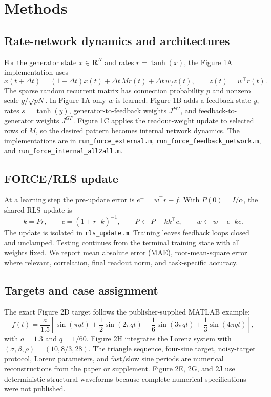 \section{Methods}

\subsection{Rate-network dynamics and architectures}
For the generator state $x\in\mathbf{R}^{N}$ and rates $r=\tanh(x)$, the Figure 1A implementation uses
\[
x(t+\Delta t)=(1-\Delta t)x(t)+\Delta t\,M r(t)+\Delta t\,w_f z(t),
\qquad z(t)=w^\top r(t).
\]
The sparse random recurrent matrix has connection probability $p$ and nonzero scale $g/\sqrt{pN}$. In Figure 1A only $w$ is learned. Figure 1B adds a feedback state $y$, rates $s=\tanh(y)$, generator-to-feedback weights $J^{FG}$, and feedback-to-generator weights $J^{GF}$. Figure 1C applies the readout-weight update to selected rows of $M$, so the desired pattern becomes internal network dynamics. The implementations are in \texttt{run\_force\_external.m}, \texttt{run\_force\_feedback\_network.m}, and \texttt{run\_force\_internal\_all2all.m}.

\subsection{FORCE/RLS update}
At a learning step the pre-update error is $e^-=w^\top r-f$. With $P(0)=I/\alpha$, the shared RLS update is
\[
k=Pr,\qquad c=(1+r^\top k)^{-1},\qquad
P\leftarrow P-kk^\top c,\qquad
w\leftarrow w-e^-kc.
\]
The update is isolated in \texttt{rls\_update.m}. Training leaves feedback loops closed and unclamped. Testing continues from the terminal training state with all weights fixed. We report mean absolute error (MAE), root-mean-square error where relevant, correlation, final readout norm, and task-specific accuracy.

\subsection{Targets and case assignment}
The exact Figure 2D target follows the publisher-supplied MATLAB example:
\[
f(t)=\frac{a}{1.5}\left[
\sin(\pi qt)+\frac{1}{2}\sin(2\pi qt)
+\frac{1}{6}\sin(3\pi qt)+\frac{1}{3}\sin(4\pi qt)\right],
\]
with $a=1.3$ and $q=1/60$. Figure 2H integrates the Lorenz system with $(\sigma,\beta,\rho)=(10,8/3,28)$. The triangle sequence, four-sine target, noisy-target protocol, Lorenz parameters, and fast/slow sine periods are numerical reconstructions from the paper or supplement. Figure 2E, 2G, and 2J use deterministic structural waveforms because complete numerical specifications were not published.

